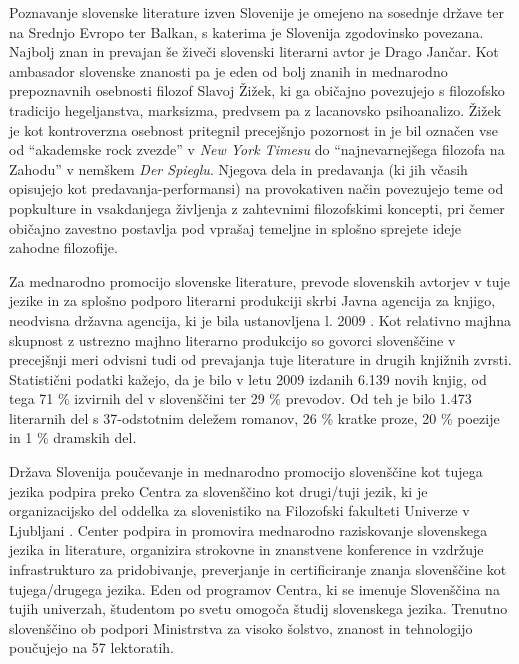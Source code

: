 \begin{multicols}{2}
Poznavanje slovenske literature izven Slovenije je omejeno na sosednje države ter na Srednjo Evropo ter Balkan, s katerima je Slovenija zgodovinsko povezana. Naj\-bolj znan in prevajan še živeči slovenski literarni avtor je Drago Jančar. Kot ambasador slovenske znanosti pa je eden od bolj znanih in mednarodno prepoznavnih osebnosti filozof Slavoj Žižek, ki ga običajno povezujejo s filozofsko tradicijo hegeljanstva, marksizma, predvsem pa z lacanovsko psihoanalizo. Žižek je kot kontroverzna osebnost pritegnil precejšnjo pozornost in je bil označen vse od “akademske rock zvezde” v \textit{New York Timesu} do “naj\-nevarnejšega filozofa na Zahodu” v nemškem \textit{Der Spieglu}. Njegova dela in predavanja (ki jih včasih opisujejo kot predavanja-performansi) na provokativen način povezujejo teme od popkulture in vsakdanjega živ\-ljenja z zah\-tevnimi filozofskimi koncepti, pri čemer običajno zavestno postav\-lja pod vprašaj temeljne in splošno sprejete ideje zahodne filozofije.


Za mednarodno promocijo slovenske literature, prevode slovenskih avtorjev v tuje jezike in za splošno podporo literarni produkciji skrbi Javna agencija za knjigo, neodvisna državna agencija, ki je bila ustanov\-ljena l. 2009 \cite{JAKRS1}.  Kot relativno majhna skupnost z ustrezno majhno literarno produkcijo so go\-vor\-ci slovenščine v precejšnji meri odvisni tudi od prevajanja tuje literature in drugih knjižnih zvrsti. Statistični podatki kažejo, da je bilo v letu 2009 izdanih 6.139 novih knjig, od tega 71 \% izvirnih del v slovenščini ter 29 \% prevodov. Od teh je bilo 1.473 literarnih del s 37-odstotnim deležem romanov, 26 \% kratke proze, 20 \% poezije in 1 \% dramskih del.

Država Slovenija poučevanje in mednarodno promocijo slovenščine kot tujega jezika podpira preko Centra za slovenščino kot drugi/tuji jezik, ki je organizacij\-sko del oddelka za slovenistiko na Filozofski fakulteti Univerze v Ljub\-ljani \cite{CSDTJ1}.  Center podpira in promovira mednarodno raziskovanje slovenskega jezika in literature, organizira strokovne in znanstvene konference in vzdržuje infrastrukturo za pridobivanje, preverjanje in certificiranje znanja slovenščine kot tujega/drugega jezika. Eden od programov Centra, ki se imenuje Slovenščina na tujih univerzah, študentom po svetu omogoča študij slovenskega jezika. Trenutno slovenščino ob podpori Ministrstva za visoko šolstvo, znanost in tehnologijo poučujejo na 57 lektoratih. 


\end{multicols}
